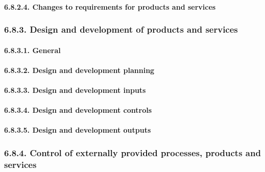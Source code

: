 \documentclass[
]{article}
\begin{document}
\hypertarget{changes-to-requirements-for-products-and-services-1}{%
\paragraph{6.8.2.4. Changes to requirements for products and
services}\label{changes-to-requirements-for-products-and-services-1}}

\hypertarget{design-and-development-of-products-and-services-1}{%
\subsubsection{6.8.3. Design and development of products and
services}\label{design-and-development-of-products-and-services-1}}

\hypertarget{general-13}{%
\paragraph{6.8.3.1. General}\label{general-13}}

\hypertarget{design-and-development-planning-1}{%
\paragraph{6.8.3.2. Design and development
planning}\label{design-and-development-planning-1}}

\hypertarget{design-and-development-inputs-1}{%
\paragraph{6.8.3.3. Design and development
inputs}\label{design-and-development-inputs-1}}

\hypertarget{design-and-development-controls-1}{%
\paragraph{6.8.3.4. Design and development
controls}\label{design-and-development-controls-1}}

\hypertarget{design-and-development-outputs-1}{%
\paragraph{6.8.3.5. Design and development
outputs}\label{design-and-development-outputs-1}}

\hypertarget{control-of-externally-provided-processes-products-and-services-1}{%
\subsubsection{6.8.4. Control of externally provided processes, products
and
services}\label{control-of-externally-provided-processes-products-and-services-1}}
\end{document}
